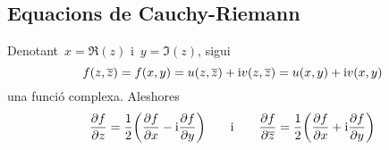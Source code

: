 \documentclass[../Apunts.tex]{subfiles}
\begin{document}
	\subsection{Equacions de Cauchy-Riemann}
	\begin{lemma}
		\label{lema:equacions de Cauchy-Riemann}
		Denotant~\(x=\Re(z)\) i~\(y=\Im(z)\), sigui
		\begin{equation*}
			\label{eq:1:lema:equaciosn de Cauchy-Riemann}
			f(z,\overline{z})
			=f(x,y)
			=u(z,\overline{z})+\mathrm{i} v(z,\overline{z})
			=u(x,y)+\mathrm{i} v(x,y)
		\end{equation*}
		una funció complexa.
		Aleshores
		\begin{equation*}
			\label{eq:3:lema:equacions de Cauchy-Riemann}
			\frac{\partial f}{\partial z}
			=\frac{1}{2}\biggl(\frac{\partial f}{\partial x}
			-\mathrm{i}\frac{\partial f}{\partial y}\biggr)
			\qquad\text{i}\qquad
			\frac{\partial f}{\partial\overline{z}}
			=\frac{1}{2}\biggl(\frac{\partial f}{\partial x}
			+\mathrm{i}\frac{\partial f}{\partial y}\biggr)
	\end{equation*}
	\end{lemma}
\end{document}
